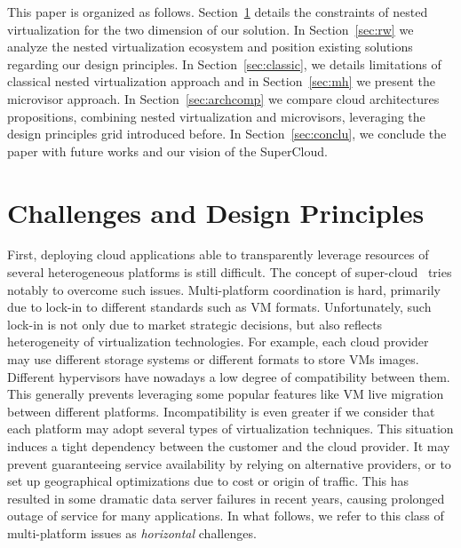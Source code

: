 \documentclass{sig-alternate}
\begin{document}
This paper is organized as follows. Section~\ref{ref:challenges} details the constraints of nested virtualization for the two dimension of our solution. In Section~\ref{sec:rw} we analyze the nested virtualization ecosystem and position existing solutions regarding our design principles. In Section~\ref{sec:classic}, we details limitations of classical nested virtualization approach and in Section~\ref{sec:mh} we present the microvisor approach. In Section~\ref{sec:archcomp} we compare cloud architectures propositions, combining nested virtualization and microvisors, leveraging the design principles grid introduced before.
In Section~\ref{sec:conclu}, we conclude the paper with future works and our vision of the SuperCloud.

\section{Challenges and Design Principles}
\label{ref:challenges}

First, deploying cloud applications able to transparently leverage resources of several heterogeneous platforms is still difficult. The concept of super-cloud~\cite{art:blan, xclo:blank} tries notably to overcome such issues. Multi-platform coordination is hard, primarily due to lock-in to different standards such as VM formats. Unfortunately, such lock-in is not only due to market strategic decisions, but also reflects heterogeneity of virtualization technologies. For example, each cloud provider may use different storage systems or different formats to store VMs images. Different hypervisors have nowadays a low degree of compatibility between them. This generally prevents leveraging some popular features like VM live migration between different platforms. Incompatibility is even greater if we consider that each platform may adopt several types of virtualization techniques. This situation induces a tight dependency between the customer and the cloud provider. It may prevent guaranteeing service availability by relying on alternative providers, or to set up geographical optimizations due to cost or origin of traffic. This has resulted in some dramatic data server failures in recent years, causing prolonged outage of service for many applications. In what follows, we refer to this class of multi-platform issues as \textit{horizontal} challenges.
\end{document}
